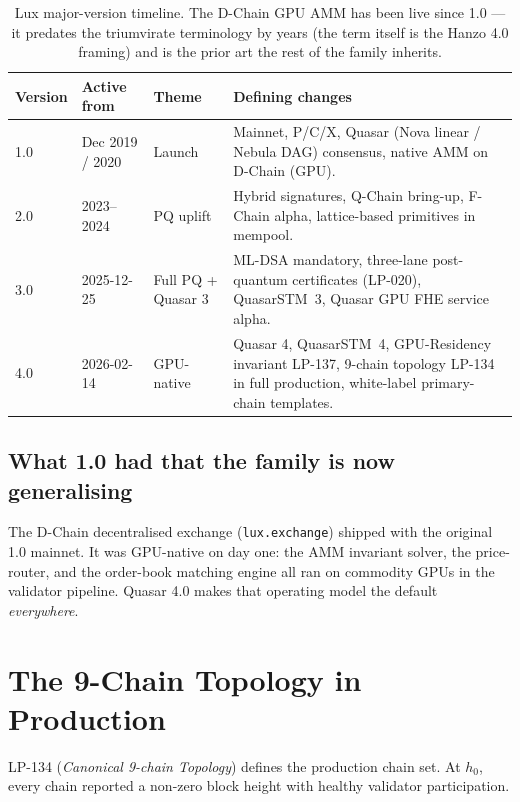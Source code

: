 \documentclass[11pt,a4paper]{article}
\begin{document}
\begin{table}[H]
\centering
\small
\begin{tabularx}{\textwidth}{lllX}
\toprule
\textbf{Version} & \textbf{Active from} & \textbf{Theme} & \textbf{Defining changes} \\
\midrule
1.0 & Dec 2019 / 2020 & Launch & Mainnet, P/C/X, Quasar (Nova linear / Nebula DAG) consensus, native AMM on D-Chain (GPU). \\
2.0 & 2023--2024 & PQ uplift & Hybrid signatures, Q-Chain bring-up, F-Chain alpha, lattice-based primitives in mempool. \\
3.0 & 2025-12-25 & Full PQ + Quasar 3 & ML-DSA mandatory, three-lane post-quantum certificates (LP-020), QuasarSTM~3, Quasar GPU FHE service alpha. \\
4.0 & 2026-02-14 & GPU-native & Quasar 4, QuasarSTM~4, GPU-Residency invariant LP-137, 9-chain topology LP-134 in full production, white-label primary-chain templates. \\
\bottomrule
\end{tabularx}
\caption{Lux major-version timeline. The D-Chain GPU AMM has been live
since 1.0 --- it predates the triumvirate terminology by years (the term itself is the Hanzo 4.0 framing) and is the
prior art the rest of the family inherits.}
\end{table}

\subsection{What 1.0 had that the family is now generalising}

The D-Chain decentralised exchange (\texttt{lux.exchange}) shipped with
the original 1.0 mainnet. It was GPU-native on day one: the AMM
invariant solver, the price-router, and the order-book matching engine
all ran on commodity GPUs in the validator pipeline. Quasar 4.0 makes
that operating model the default \emph{everywhere}.

\section{The 9-Chain Topology in Production}
\label{sec:topology}

LP-134 (\emph{Canonical 9-chain Topology}) defines the production
chain set. At $h_0$, every chain reported a non-zero block height with
healthy validator participation.
\end{document}
